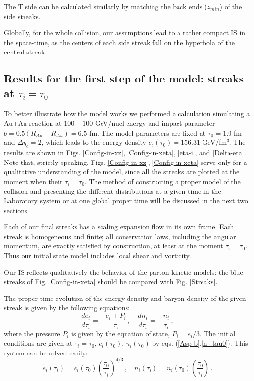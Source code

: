 \documentclass[aps,prc,twocolumn,floatfix,showpacs,a4paper,
nofootinbib,amsmath,amssymb]{revtex4-1}
\newcommand{\be}{\begin{equation}}
\newcommand{\ee}{\end{equation}}
\begin{document}
The T side can be calculated similarly by matching the back ends
($z_{min}$) of the side streaks.



Globally, for the whole collision, our assumptions lead to a rather compact IS in the space-time, as the centers of each side streak fall on the hyperbola of the central streak.

\subsection{Results for the first step of the model: streaks at $\tau_i=\tau_0$}
\label{3C}

To better illustrate how the model works we performed a calculation simulating a
Au+Au reaction at $100+100$ GeV/nucl energy and impact parameter
$b= 0.5 (R_{Au} + R_{Au}) = 6.5$ fm. The model parameters are fixed at $\tau_0=1.0$ fm  and $\Delta \eta_c = 2$, 
which leads to the energy density $e_c(\tau_0)  = 156.31$ GeV/fm$^3$.  
The  results are shown in  Figs. \ref{Config-in-xz}, \ref{Config-in-xeta}, \ref{eta-i}, and \ref{Delta-eta}.  Note that, strictly speaking, Figs. \ref{Config-in-xz}, \ref{Config-in-xeta} serve only for a qualitative 
understanding of the model, since all the streaks are plotted at the moment when their $\tau_i=\tau_0$. The method of constructing a proper model of the collision and presenting the different distributions at a given time in the Laboratory system or at one global proper time will be discussed in the next two sections. 


Each of our final streaks has a scaling expansion flow in its own frame. Each streak is homogeneous and finite; all
conservation laws, including the angular momentum, are exactly satisfied by construction, at least at the moment $\tau_i=\tau_0$. 
Thus our initial state model includes local shear and vorticity.

Our IS reflects qualitatively the 
behavior of the parton kinetic models: the blue streaks of Fig. \ref{Config-in-xeta} should be compared with Fig. \ref{Streaks}.




The  proper time evolution of the energy density and baryon density of the given streak is given by the following equations:
\be
\frac{d e_i}{d \tau_i}=-\frac{e_i+P_i}{\tau_i}\,, \quad \frac{d n_i}{d \tau_i}=-\frac{n_i}{\tau_i}\,,
\label{Bjorken}
\ee   
where the pressure $P_i$ is given by the equation of state,  $P_i=e_i/3$. 
The initial conditions are given at  $\tau_i=\tau_0$, $e_i(\tau_0)$, $n_i(\tau_0)$ by eqs. (\ref{Asp-b},\ref{n_tau0}). This system can be solved easily:
\be
e_i(\tau_i)=e_i(\tau_0)\left(\frac{\tau_0}{\tau_i}\right)^{4/3}\,, \quad
n_i(\tau_i)=n_i(\tau_0)\left(\frac{\tau_0}{\tau_i}\right)\,.
\label{bjor-sol}
\ee
\end{document}
